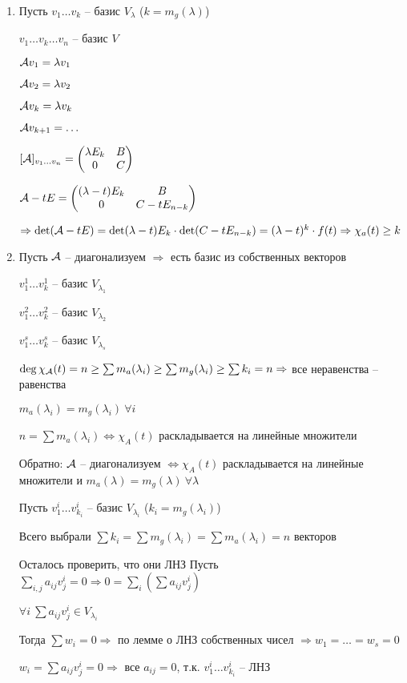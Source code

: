 \documentclass[12pt]{article}
\begin{document}
\begin{enumerate}
    \item Пусть $v_1 \ldots v_k$ -- базис $V_\lambda$ ($k = m_g(\lambda)$)
    
    $v_1 \ldots v_k \ldots v_n$ -- базис $V$

    $\mathcal{A} v_1 = \lambda v_1$

    $\mathcal{A} v_2 = \lambda v_2$

    $\mathcal{A} v_k = \lambda v_k$

    $\mathcal{A} v_{k + 1} = \ldots$

    $[\mathcal{A}]_{v_1 \ldots v_n} = \begin{pmatrix}
        \lambda E_k & B \\
        0 & C
    \end{pmatrix}$

    $\mathcal{A} - tE = \begin{pmatrix}
        (\lambda - t)E_k & B \\
        0 & C - tE_{n - k}
    \end{pmatrix}$

    $\Rightarrow \det(\mathcal{A} - tE) = \det(\lambda - t)E_k \cdot \det(C - tE_{n - k}) = (\lambda - t)^k \cdot f(t) \Rightarrow \chi_a(t) \geq k$

    \item Пусть $\mathcal{A}$ -- диагонализуем $\Rightarrow$ есть базис из собственных векторов
    
    $v_1^1 \ldots v_k^1$ -- базис $V_{\lambda_1}$

    $v_1^2 \ldots v_k^2$ -- базис $V_{\lambda_2}$

    $v_1^s \ldots v_k^s$ -- базис $V_{\lambda_s}$

    $\deg \chi_{\mathcal{A}}(t) = n \geq \sum m_a(\lambda_i) \geq \sum m_g(\lambda_i) \geq \sum k_i = n \Rightarrow$ все неравенства -- равенства 

    $m_a(\lambda_i) = m_g(\lambda_i)\ \forall i$

    $n = \sum m_a(\lambda_i) \Leftrightarrow \chi_A(t)$ раскладывается на линейные множители

    Обратно: $\mathcal{A}$ -- диагонализуем $\Leftrightarrow \chi_A(t)$ раскладывается на линейные множители и $m_a(\lambda) = m_g(\lambda)\ \forall \lambda$

    Пусть $v_1^i \ldots v_{k_i}^i$ -- базис $V_{\lambda_i}$ ($k_i = m_g(\lambda_i)$)

    Всего выбрали $\sum k_i = \sum m_g(\lambda_i) = \sum m_a(\lambda_i) = n$ векторов

    Осталось проверить, что они ЛНЗ
    Пусть $\sum\limits_{i, j} a_{ij}v_j^i = 0 \Rightarrow 0 = \sum\limits_i(\sum a_{ij}v_j^i)$

    $\forall i\ \sum a_{ij}v_j^i \in V_{\lambda_i}$

    Тогда $\sum w_i = 0 \Rightarrow$ по лемме о ЛНЗ собственных чисел $\Rightarrow w_1 = \ldots = w_s = 0$

    $w_i = \sum a_{ij}v_j^i = 0 \Rightarrow$ все $a_{ij} = 0$, т.к. $v_1^i \ldots v_{k_i}^i$ -- ЛНЗ
\end{enumerate}
\end{document}
